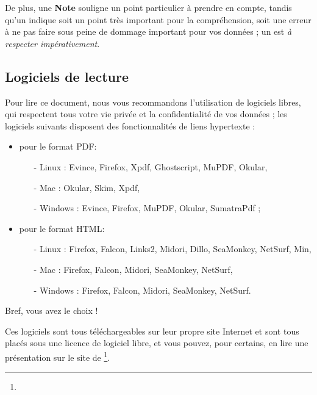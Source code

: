 De plus, une \textbf{Note} souligne un point particulier à prendre en compte, tandis qu'un \textcolor{red}{} indique soit un point très important pour la compréhension, soit une erreur à ne pas faire sous peine de dommage important pour vos données ; un \textcolor{red}{} est \emph{à respecter impérativement}.


\subsection{Logiciels de lecture\label{introduction-manual-readers}}

Pour lire ce document, nous vous recommandons l'utilisation de logiciels libres, qui respectent tous votre vie privée et la confidentialité de vos données ; les logiciels suivants disposent des fonctionnalités de \gls{liens hypertexte} : 
\begin{itemize}
	\item pour le format \gls{PDF}: 
		\begin{itemize}
				\item[-] Linux : Evince, Firefox, Xpdf, Ghostscript, MuPDF, Okular,
				\item[-] Mac : Okular, Skim, Xpdf,
				\item[-] Windows : Evince, Firefox, MuPDF, Okular, SumatraPdf ;
		\end{itemize}
	\item pour le format \gls{HTML}:
		\begin{itemize}
				\item[-] Linux : Firefox, Falcon, Links2, Midori, Dillo, SeaMonkey, NetSurf, Min,
				\item[-] Mac : Firefox, Falcon, Midori, SeaMonkey, NetSurf,
				\item[-] Windows : Firefox, Falcon, Midori, SeaMonkey, NetSurf.
		\end{itemize}
\end{itemize}

Bref, vous avez le choix !

Ces logiciels sont tous téléchargeables sur leur propre site Internet et sont tous placés sous une licence de \gls{logiciel libre}, et vous pouvez, pour certains, en lire une présentation sur le site de \footnote{\urlFramasoftLogiciels{}}.
